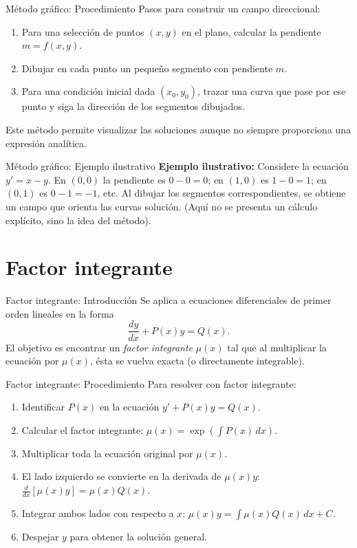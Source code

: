 \documentclass{beamer}
\begin{document}
\begin{frame}{Método gráfico: Procedimiento}
Pasos para construir un campo direccional:
\begin{enumerate}
  \item Para una selección de puntos $(x,y)$ en el plano, calcular la pendiente $m = f(x,y)$.
  \item Dibujar en cada punto un pequeño segmento con pendiente $m$.
  \item Para una condición inicial dada $(x_0,y_0)$, trazar una curva que pase por ese punto y siga la dirección de los segmentos dibujados.
\end{enumerate}
Este método permite visualizar las soluciones aunque no siempre proporciona una expresión analítica.
\end{frame}

\begin{frame}{Método gráfico: Ejemplo ilustrativo}
\textbf{Ejemplo ilustrativo:} Considere la ecuación $y' = x - y$. En $(0,0)$ la pendiente es $0-0=0$; en $(1,0)$ es $1-0=1$; en $(0,1)$ es $0-1=-1$, etc. Al dibujar los segmentos correspondientes, se obtiene un campo que orienta las curvas solución. (Aquí no se presenta un cálculo explícito, sino la idea del método).
\end{frame}

\section*{Factor integrante}
\begin{frame}{Factor integrante: Introducción}
Se aplica a ecuaciones diferenciales de primer orden lineales en la forma
\[
\frac{dy}{dx} + P(x)y = Q(x).
\]
El objetivo es encontrar un \emph{factor integrante} $\mu(x)$ tal que al multiplicar la ecuación por $\mu(x)$, ésta se vuelva exacta (o directamente integrable).
\end{frame}

\begin{frame}{Factor integrante: Procedimiento}
Para resolver con factor integrante:
\begin{enumerate}
  \item Identificar $P(x)$ en la ecuación $y' + P(x)y = Q(x)$.
  \item Calcular el factor integrante: $\mu(x) = \exp\left(\int P(x)\,dx\right)$.
  \item Multiplicar toda la ecuación original por $\mu(x)$.
  \item El lado izquierdo se convierte en la derivada de $\mu(x)y$: $\frac{d}{dx}[\mu(x)y] = \mu(x)Q(x)$.
  \item Integrar ambos lados con respecto a $x$: $\mu(x)y = \int \mu(x)Q(x)\,dx + C$.
  \item Despejar $y$ para obtener la solución general.
\end{enumerate}
\end{frame}
\end{document}
